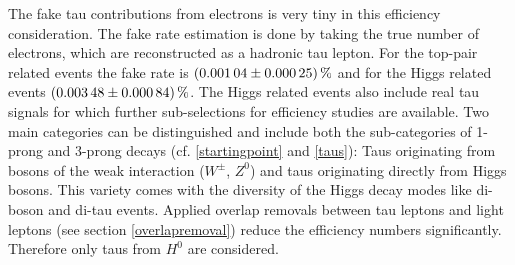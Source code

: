 %
The fake tau contributions from electrons is very tiny in this efficiency consideration. The fake rate estimation is done by taking the true number of electrons, which are reconstructed as a hadronic tau lepton. For the top-pair related events the fake rate is $\SI{0.00104\pm 0.00025}{\percent}$ and for the Higgs related events $\SI{0.00348\pm 0.00084}{\percent}$.
The Higgs related events also include real tau signals for which further sub-selections for efficiency studies are available. Two main categories can be distinguished and include both the sub-categories of 1-prong and 3-prong decays (cf. \ref{startingpoint} and \ref{taus}): Taus originating from bosons of the weak interaction ($W^\pm$, $Z^0$) and taus originating directly from Higgs bosons. This variety comes with the diversity of the Higgs decay modes like di-boson and di-tau events. Applied overlap removals between tau leptons and light leptons (see section \ref{overlapremoval}) reduce the efficiency numbers significantly. Therefore only taus from $H^0$ are considered. %
%
